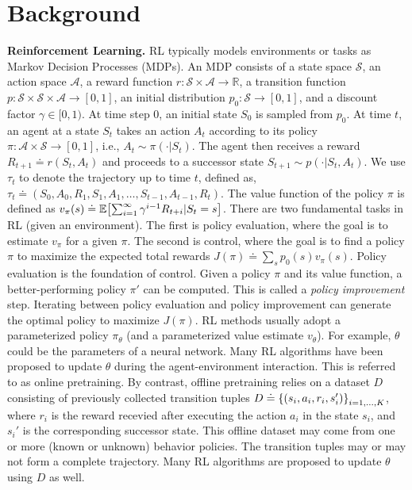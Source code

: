 \documentclass{article}
\newcommand{\tb}[1]{\textbf{#1}}
\newcommand{\compactpara}[1]{\noindent\tb{#1}\quad}
\newcommand{\fS}{\mathcal{S}}
\newcommand{\fA}{\mathcal{A}}
\newcommand{\R}{\mathbb{R}}
\newcommand{\E}{\mathbb{E}}
\begin{document}
\section{Background}
\compactpara{Reinforcement Learning.}
RL typically models environments or tasks as Markov Decision Processes (MDPs).
An MDP consists of a state space $\fS$, an action space $\fA$, a reward function $r: \fS \times \fA \to \R$, a transition function $p: \fS \times \fS \times \fA \to [0, 1]$, an initial distribution $p_0: \fS \to [0, 1]$, and a discount factor $\gamma \in [0, 1)$.
At time step $0$,
an initial state $S_0$ is sampled from $p_0$.
At time $t$,
an agent at a state $S_t$ takes an action $A_t$ according to its policy $\pi: \fA \times \fS \to [0, 1]$, i.e., $A_t \sim \pi(\cdot | S_t)$.
The agent then receives a reward $R_{t+1} \doteq r(S_t, A_t)$ and proceeds to a successor state $S_{t+1} \sim p(\cdot | S_t, A_t)$.
We use $\tau_t$ to denote the trajectory up to time $t$,
defined as, $\tau_t \doteq (S_0, A_0, R_1, S_1, A_1, \dots, S_{t-1}, A_{t-1}, R_t)$.
The value function of the policy $\pi$ is defined as $v_\pi(s) \doteq \E\qty[\sum_{i=1}^\infty \gamma^{i-1} R_{t+i} | S_t = s]$.
There are two fundamental tasks in RL (given an environment).
The first is policy evaluation,
where the goal is to estimate $v_\pi$ for a given $\pi$.
The second is control,
where the goal is to find a policy $\pi$ to maximize the expected total rewards $J(\pi) \doteq \sum_s p_0(s)v_\pi(s)$.
Policy evaluation is the foundation of control.
Given a policy $\pi$ and its value function,
a better-performing policy $\pi'$ can be computed.
This is called a \emph{policy improvement} step.
Iterating between policy evaluation and policy improvement can generate the optimal policy to maximize $J(\pi)$.
RL methods usually adopt a parameterized policy $\pi_\theta$ (and a parameterized value estimate $v_\theta$).
For example,
$\theta$ could be the parameters of a neural network.
Many RL algorithms have been proposed to update $\theta$ during the agent-environment interaction.
This is referred to as online pretraining.
By contrast, offline pretraining relies on a dataset $D$
consisting of previously collected transition tuples
$D \doteq \qty{(s_i, a_i, r_i, s_i')}_{i=1,\dots,K}$, where $r_i$ is the reward recevied after executing the action $a_i$ in the state $s_i$, and $s_i'$ is the corresponding successor state.
This offline dataset may come from one or more (known or unknown) behavior policies.
The transition tuples may or may not form a complete trajectory.
Many RL algorithms are proposed to update $\theta$ using $D$ as well.
\end{document}
